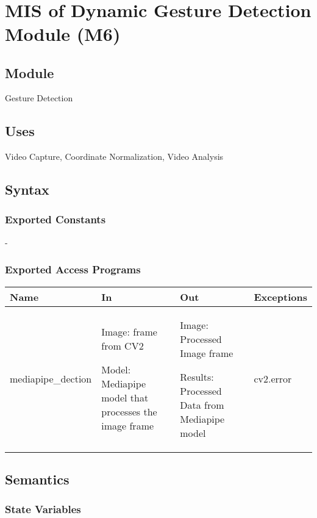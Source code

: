 \documentclass[12pt, titlepage]{article}
\begin{document}
~\newpage
\section{MIS of Dynamic Gesture Detection Module (M6)} \label{M6}

\subsection{Module}

Gesture Detection\\

\subsection{Uses}

Video Capture, Coordinate Normalization, Video Analysis\\

\subsection{Syntax}

\subsubsection{Exported Constants}
-

\subsubsection{Exported Access Programs}
\begin{center}
\begin{tabular}{p{5cm} p{3cm} p{3cm} p{4cm}}
\hline
\textbf{Name} & \textbf{In} & \textbf{Out} & \textbf{Exceptions} \\
\hline
mediapipe_dection & 
Image: frame from CV2

Model: Mediapipe model that processes the image frame
 & Image: Processed Image frame

Results: Processed Data from Mediapipe model
 & cv2.error \\
\hline
\end{tabular}
\end{center}

\subsection{Semantics}

\subsubsection{State Variables}
\end{document}
